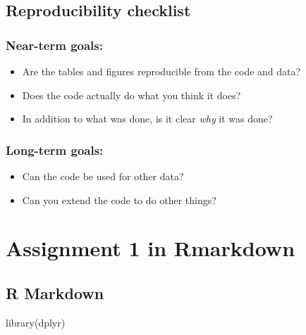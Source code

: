 \documentclass[
]{book}
\newenvironment{Shaded}{\begin{snugshade}}{\end{snugshade}}
\newcommand{\FunctionTok}[1]{\textcolor[rgb]{0.00,0.00,0.00}{#1}}
\newcommand{\NormalTok}[1]{#1}
\providecommand{\tightlist}{%
  \setlength{\itemsep}{0pt}\setlength{\parskip}{0pt}}
\theoremstyle{definition}
\theoremstyle{definition}
\theoremstyle{definition}
\theoremstyle{definition}
\theoremstyle{remark}
\begin{document}
\hypertarget{reproducibility-checklist}{%
\section{Reproducibility checklist}\label{reproducibility-checklist}}

\hypertarget{near-term-goals}{%
\subsection{Near-term goals:}\label{near-term-goals}}

\begin{itemize}
\tightlist
\item
  Are the tables and figures reproducible from the code and data?
\item
  Does the code actually do what you think it does?
\item
  In addition to what was done, is it clear \emph{why} it was done?
\end{itemize}

\hypertarget{long-term-goals}{%
\subsection{Long-term goals:}\label{long-term-goals}}

\begin{itemize}
\tightlist
\item
  Can the code be used for other data?
\item
  Can you extend the code to do other things?
\end{itemize}

\hypertarget{assignment-1-in-rmarkdown}{%
\chapter{Assignment 1 in Rmarkdown}\label{assignment-1-in-rmarkdown}}

\hypertarget{r-markdown}{%
\section{R Markdown}\label{r-markdown}}

\begin{Shaded}
\begin{Highlighting}[]
\FunctionTok{library}\NormalTok{(dplyr)}
\end{Highlighting}
\end{Shaded}
\end{document}
